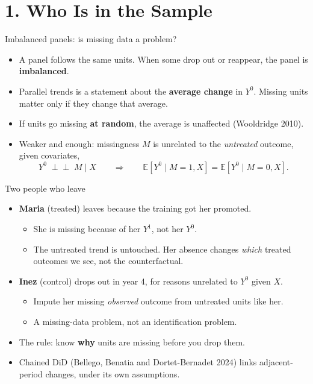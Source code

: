\documentclass[
  11pt,
  ignorenonframetext,
  aspectratio=169,
]{beamer}
\providecommand{\tightlist}{%
  \setlength{\itemsep}{0pt}\setlength{\parskip}{0pt}}
\newcommand{\indep}{\perp\!\!\!\perp}
\begin{document}
\section{1. Who Is in the Sample}\label{who-is-in-the-sample}

\begin{frame}{Imbalanced panels: is missing data a problem?}
\protect{}\label{imbalanced-panels-is-missing-data-a-problem}
\begin{itemize}
\tightlist
\item
  A panel follows the same units. When some drop out or reappear, the
  panel is \textbf{imbalanced}.
\item
  Parallel trends is a statement about the \textbf{average change} in
  \(Y^0\). Missing units matter only if they change that average.
\item
  If units go missing \textbf{at random}, the average is unaffected
  (Wooldridge 2010).
\item
  Weaker and enough: missingness \(M\) is unrelated to the
  \emph{untreated} outcome, given covariates, \[
  Y^0 \;\indep\; M \mid X \qquad\Longrightarrow\qquad \mathbb{E}[Y^0 \mid M=1, X] = \mathbb{E}[Y^0 \mid M=0, X].
  \]
\end{itemize}
\end{frame}

\begin{frame}{Two people who leave}
\protect{}\label{two-people-who-leave}
\begin{itemize}
\tightlist
\item
  \textbf{Maria} (treated) leaves because the training got her promoted.

  \begin{itemize}
  \tightlist
  \item
    She is missing because of her \(Y^1\), not her \(Y^0\).
  \item
    The untreated trend is untouched. Her absence changes \emph{which}
    treated outcomes we see, not the counterfactual.
  \end{itemize}
\item
  \textbf{Inez} (control) drops out in year 4, for reasons unrelated to
  \(Y^0\) given \(X\).

  \begin{itemize}
  \tightlist
  \item
    Impute her missing \emph{observed} outcome from untreated units like
    her.
  \item
    A missing-data problem, not an identification problem.
  \end{itemize}
\end{itemize}

\vspace{0.4em}

\begin{itemize}
\tightlist
\item
  The rule: know \textbf{why} units are missing before you drop them.
\item
  Chained DiD (Bellego, Benatia and Dortet-Bernadet 2024) links
  adjacent-period changes, under its own assumptions.
\end{itemize}
\end{frame}
\end{document}
